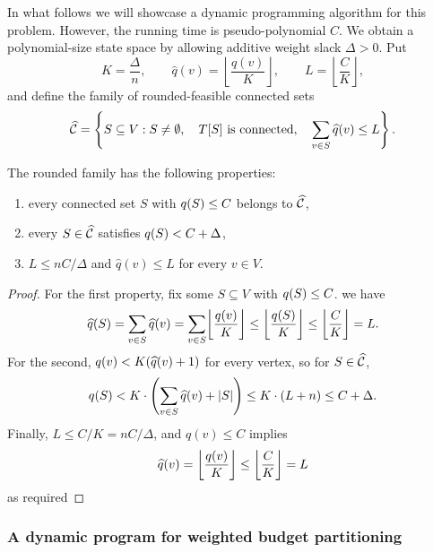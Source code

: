 In what follows we will showcase a dynamic programming algorithm for this problem. However, the running time is pseudo-polynomial $C$. We obtain a polynomial-size state space by allowing additive weight slack $\Delta>0$. Put
\[
    K=\frac{\Delta}{n},
    \qquad
    \widehat q(v)=\left\lfloor\frac{q(v)}{K}\right\rfloor,
    \qquad
    L=\left\lfloor\frac{C}{K}\right\rfloor,
\]
and define the family of rounded-feasible connected sets
\[
    \widehat{\mathcal{C}}
    =\left\{
        S\subseteq V:
        S\neq\emptyset,\quad
        T[S]\text{ is connected},\quad
        \sum_{v\in S}\widehat q(v)\leq L
    \right\}.
\]

\begin{lemma}\label{lem:weighted-budget-rounding}
    The rounded family has the following properties:
    \begin{enumerate}
        \item every connected set $S$ with $q\mathopen{}\left( S \right)\leq C$ belongs to $\widehat{\mathcal{C}}$,
        \item every $S\in\widehat{\mathcal{C}}$ satisfies $q\mathopen{}\left( S \right)<C+\Delta$,
        \item $L\leq nC/\Delta$ and $\widehat q(v)\leq L$ for every $v\in V$.
    \end{enumerate}
\end{lemma}
\begin{proof}
    For the first property, fix some $S\subseteq V$ with $q\mathopen{}\left( S \right)\leq C$. we have
    \[
        \widehat q(S)=\sum_{v\in S}\widehat q(v)=\sum_{v\in S}\mathopen{}\left\lfloor \frac{q\mathopen{}\left( v \right)}{K} \right\rfloor
        \leq\mathopen{}\left\lfloor \frac{q\mathopen{}\left( S \right)}{K} \right\rfloor
        \leq\mathopen{}\left\lfloor \frac{C}{K} \right\rfloor=L.
    \]
    For the second, $q(v)<K\mathopen{}\left( \widehat q(v)+1 \right)$ for every vertex, so for $S\in\widehat{\mathcal{C}}$,
    \[
        q\mathopen{}\left( S \right)
        <K\cdot \mathopen{}\left( \sum_{v\in S}\widehat q(v)+|S| \right)
        \leq K\cdot (L+n)
        \leq C+\Delta.
    \]
    Finally, $L\leq C/K=nC/\Delta$, and $q(v)\leq C$ implies 
    \[
    \widehat q(v) = \mathopen{}\left\lfloor \frac{q(v)}{K} \right\rfloor\leq \mathopen{}\left\lfloor \frac{C}{K} \right\rfloor=L
    \]
    as required
\end{proof}

\subsubsection{A dynamic program for weighted budget partitioning}

